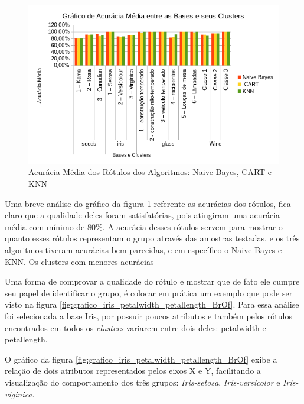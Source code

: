 \begin{figure}[h!]
        \centering
        \includegraphics[scale=0.9]{figs/grafico_acuracia_media_algoritmos.png}
        \caption{Acurácia Média dos Rótulos dos Algoritmos: Naive Bayes, CART e KNN} \label{fig:acuracia_media_algoritmos}
\end{figure}

Uma breve análise do gráfico da figura \ref{fig:acuracia_media_algoritmos} referente as acurácias dos rótulos, fica claro que a qualidade deles foram satisfatórias, pois atingiram uma acurácia média com mínimo de 80\%. A acurácia desses rótulos servem para mostrar o quanto esses rótulos representam o grupo através das amostras testadas, e os três algoritmos tiveram acurácias bem parecidas, e em específico o Naive Bayes e KNN. Os clusters com menores acurácias 

Uma forma de comprovar a qualidade do rótulo e mostrar que de fato ele cumpre seu papel de identificar o grupo, é colocar em prática um exemplo que pode ser visto na figura \ref{fig:grafico_iris_petalwidth_petallength_BrOf}. Para essa análise foi selecionada a base Iris, por possuir poucos atributos e também pelos rótulos encontrados em todos os \textit{clusters} variarem entre dois deles: petalwidth e petallength. 


O gráfico da figura \ref{fig:grafico_iris_petalwidth_petallength_BrOf} exibe a relação de dois atributos representados pelos eixos X e Y, facilitando a visualização do comportamento dos três grupos: \textit{Iris-setosa}, \textit{Iris-versicolor} e \textit{Iris-viginica}.

